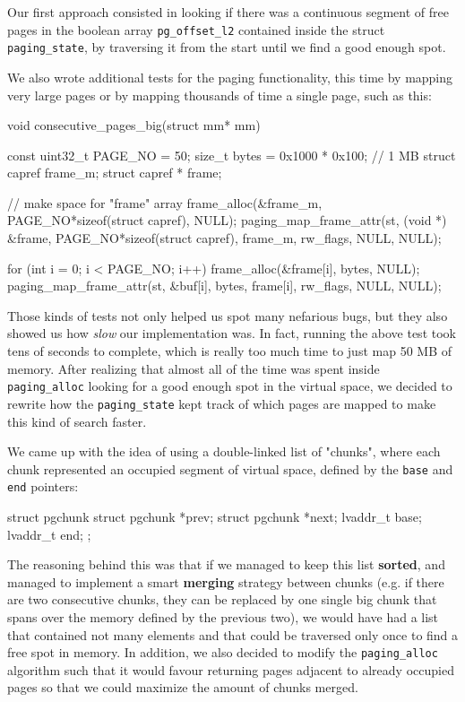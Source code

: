 \documentclass[a4paper,twoside,openright]{report}
\renewcommand{\t}[1]{%
	{\texttt{#1}}}
\begin{document}
Our first approach consisted in looking if there was a continuous segment of free pages
in the boolean array \t{pg\_offset\_l2} contained inside the struct \t{paging\_state}, by
traversing it from the start until we find a good enough spot.

We also wrote additional tests for the paging functionality, this time by mapping very large 
pages or by mapping thousands of time a single page, such as this:

\begin{pandacode}
void consecutive_pages_big(struct mm* mm) {
	const uint32_t PAGE_NO = 50;
	size_t bytes = 0x1000 * 0x100; // 1 MB
	struct capref frame_m;
	struct capref * frame;

	// make space for "frame" array
	frame_alloc(&frame_m, PAGE_NO*sizeof(struct capref), NULL);
	paging_map_frame_attr(st, (void *) &frame, PAGE_NO*sizeof(struct capref), frame_m, rw_flags, NULL, NULL);

	for (int i = 0; i < PAGE_NO; i++) {
		frame_alloc(&frame[i], bytes, NULL);
		paging_map_frame_attr(st, &buf[i], bytes, frame[i], rw_flags, NULL, NULL);
	}
}
\end{pandacode}

Those kinds of tests not only helped us spot many nefarious bugs, but they also showed us 
how \emph{slow} our implementation was. In fact, running the above test took tens of seconds
to complete, which is really too much time to just map 50 MB of memory.
After realizing that almost all of the time was spent inside \t{paging\_alloc} looking
for a good enough spot in the virtual space, we decided to rewrite how the \t{paging\_state}
kept track of which pages are mapped to make this kind of search faster.

We came up with the idea of using a double-linked list of "chunks", where each chunk represented
an occupied segment of virtual space, defined by the \t{base} and \t{end} pointers:

\begin{pandacode}
struct pgchunk {
	struct pgchunk *prev;
	struct pgchunk *next;
	lvaddr_t base;       
	lvaddr_t end;        
};
\end{pandacode}

The reasoning behind this was that if we managed to keep this list \textbf{sorted}, and managed to implement
a smart \textbf{merging} strategy between chunks (e.g. if there are two consecutive chunks,
they can be replaced by one single big chunk that spans over the memory defined by the previous two), 
we would have had a list that contained not many elements and that could be traversed only once to find
a free spot in memory. In addition, we also decided to modify the \t{paging\_alloc} algorithm such that
it would favour returning pages adjacent to already occupied pages so that we could maximize the amount
of chunks merged.
\end{document}
